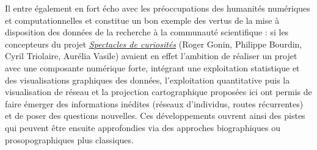 \documentclass[final, fra]{anthology-ch}     %
\begin{document}
Il entre également en fort écho avec les préoccupations des humanités numériques et computationnelles et constitue un bon exemple des vertus de la mise à disposition des données de la recherche à la communauté scientifique : si les concepteurs du projet \href{https://spectacle-de-curiosites.msh.uca.fr/}{\textit{Spectacles de curiosités}} (Roger Gonin, Philippe Bourdin, Cyril Triolaire, Aurélia Vasile) avaient en effet l’ambition de réaliser un projet avec une composante numérique forte, intégrant une exploitation statistique et des visualisations graphiques des données, l’exploitation quantitative puis la visualisation de réseau et la projection cartographique proposées ici ont permis de faire émerger des informations inédites (réseaux d’individus, routes récurrentes) et de poser des questions nouvelles. Ces développements ouvrent ainsi des pistes qui peuvent être ensuite approfondies via des approches biographiques ou prosopographiques plus classiques.


\printbibliography
\end{document}
